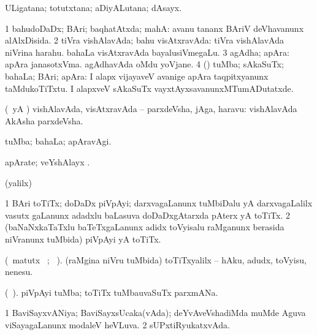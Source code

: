 \bentry
{} 
\gl{\nA}
\expl{}
\bmng
 ULigatana; totutxtana; aDiyALutana; dAsayx. 
\emng
\eentry

\bentry
{} 
\gl{\gu}
\expl{}
\bmng
\bnum
\num{1} bahudoDaDx; BAri; baqhatAtxda; mahA:  avanu tananx BAriV deVhavanunx alAlxDisida. 
\num{2} tiVra vishAlavAda; bahu visAtxravAda:  tiVra vishAlavAda niVrina harahu.  bahaLa visAtxravAda bayalusiVmegaLu. 
\num{3} agAdha; apAra:  apAra janasotxVma.  agAdhavAda oMdu yoVjane. 
\num{4} (\AmA) tuMba; sAkaSuTx; bahaLa; BAri; apAra:  I alapx vijayaveV avanige apAra taqpitxyanunx taMdukoTiTxtu.  I alapxveV sAkaSuTx vayxtAyxsavanunxMTumADutatxde. 
\enum
\emng
\eentry

\bentry
{} 
\gl{\nA}
\expl{}
\bmng
 (\kAparx\ yA \rUpa) vishAlavAda, visAtxravAda -- parxdeVsha, jAga, haravu:  vishAlavAda AkAsha parxdeVsha. 
\emng
\eentry


\bentry
{} 
\gl{\kirxvi}
\expl{}
\bmng
 tuMba; bahaLa; apAravAgi. 
\emng
\eentry

\bentry
{} 
\gl{\nA}
\expl{}
\bmng
 apArate; veYshAlayx 
\emng
. \eentry

\bentry
{} 
\gl{\saMkiSx}
\expl{}
\bmng
(\UK yalilx)  
\emng
\eentry

\bentry
{} 
\gl{\nA}
\expl{}
\bmng
\bnum
\num{1} BAri toTiTx; doDaDx piVpAyi; darxvagaLanunx tuMbiDalu yA darxvagaLalilx vasutx gaLanunx adadxlu baLasuva doDaDxgAtarxda pAterx yA toTiTx. 
\num{2} (baNaNxkaTaTxlu baTeTxgaLanunx adidx toVyisalu raMganunx berasida niVranunx tuMbida) piVpAyi yA toTiTx. 
\enum
\emng
\eentry

\bentry
{} 
\gl{\sakirx}(\BU\ matutx \BUkaq\ ; \vakaq\ ). 
\bmng
 (raMgina niVru tuMbida) toTiTxyalilx -- hAku, adudx, toVyisu, nenesu. 
\emng
\eentry

\bentry
{} 
\gl{\nA}(\bava\ ). 
\bmng
piVpAyi tuMba; toTiTx tuMbauvaSuTx parxmANa. 
\emng
\eentry

\bentry
{} 
\gl{\gu}
\expl{}
\bmng
\bnum
\num{1} BaviSayxvANiya; BaviSayxsUcaka(vAda); deYvAveVshadiMda muMde Aguva viSayagaLanunx modaleV heVLuva. 
\num{2} sUPxtiRyukatxvAda. 
\enum
\emng
\eentry

